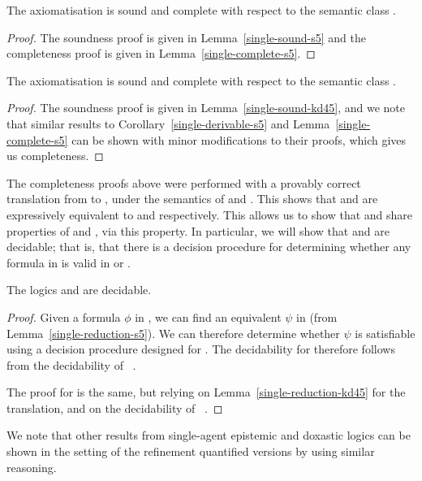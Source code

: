 \begin{theorem}
The axiomatisation \axiomSiF{} is sound and complete with respect to the
semantic class \classSi{}.
\end{theorem}

\begin{proof}
The soundness proof is given in Lemma~\ref{single-sound-s5} and the completeness
proof is given in Lemma~\ref{single-complete-s5}.
\end{proof}

\begin{theorem}
The axiomatisation \axiomKDiF{} is sound and complete with respect to the
semantic class \classKDi{}.
\end{theorem}

\begin{proof}
The soundness proof is given in Lemma~\ref{single-sound-kd45}, and we note that
similar results to Corollary~\ref{single-derivable-s5} and
Lemma~\ref{single-complete-s5} can be shown with minor modifications to their
proofs, which gives us completeness.
\end{proof}

The completeness proofs above were performed with a provably correct translation
from \langFi{} to \langi{}, under the semantics of \logicSiF{} and \logicKDiF{}.
This shows that \logicSiF{} and \logicKDiF{} are expressively equivalent to
\logicSi{} and \logicKDi{} respectively. This allows us to show that \logicSiF{}
and \logicKDiF{} share properties of \logicSi{} and \logicKDi{}, via this
property. In particular, we will show that \logicSiF{} and \logicKDiF{} are
decidable; that is, that there is a decision procedure for determining whether
any formula in \langFi{} is valid in \logicSiF{} or \logicKDiF{}.


\begin{theorem}\label{single-decidable}
The logics \logicSiF{} and \logicKDiF{} are decidable.
\end{theorem}

\begin{proof}
Given a formula $\phi$ in \logicSiF{}, we can find an equivalent $\psi$ in
\logicSi{} (from Lemma~\ref{single-reduction-s5}). We can therefore determine whether
$\psi$ is satisfiable using a decision procedure designed for \logicSi{}. The
decidability for \logicSiF{} therefore follows from the decidability of
\logicSi{}~\cite{blackburn2002modal}.

The proof for \logicKDiF{} is the same, but relying on
Lemma~\ref{single-reduction-kd45} for the translation, and on the decidability of
\logicKDi{}~\cite{blackburn2002modal}.
\end{proof}

We note that other results from single-agent epistemic and doxastic logics can
be shown in the setting of the refinement quantified versions by using similar
reasoning.
